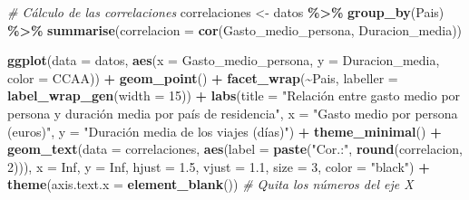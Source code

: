 \documentclass[data,article,submit,moreauthors,pdftex]{Definitions/mdpi}
\newenvironment{Shaded}{\begin{snugshade}}{\end{snugshade}}
\newcommand{\AttributeTok}[1]{\textcolor[rgb]{0.13,0.29,0.53}{#1}}
\newcommand{\CommentTok}[1]{\textcolor[rgb]{0.56,0.35,0.01}{\textit{#1}}}
\newcommand{\ConstantTok}[1]{\textcolor[rgb]{0.56,0.35,0.01}{#1}}
\newcommand{\DecValTok}[1]{\textcolor[rgb]{0.00,0.00,0.81}{#1}}
\newcommand{\FloatTok}[1]{\textcolor[rgb]{0.00,0.00,0.81}{#1}}
\newcommand{\FunctionTok}[1]{\textcolor[rgb]{0.13,0.29,0.53}{\textbf{#1}}}
\newcommand{\NormalTok}[1]{#1}
\newcommand{\OtherTok}[1]{\textcolor[rgb]{0.56,0.35,0.01}{#1}}
\newcommand{\SpecialCharTok}[1]{\textcolor[rgb]{0.81,0.36,0.00}{\textbf{#1}}}
\newcommand{\StringTok}[1]{\textcolor[rgb]{0.31,0.60,0.02}{#1}}
\begin{document}
\begin{Shaded}
\begin{Highlighting}[]
\CommentTok{\# Cálculo de las correlaciones}
\NormalTok{correlaciones }\OtherTok{\textless{}{-}}\NormalTok{ datos }\SpecialCharTok{\%\textgreater{}\%}
    \FunctionTok{group\_by}\NormalTok{(Pais) }\SpecialCharTok{\%\textgreater{}\%}
    \FunctionTok{summarise}\NormalTok{(}\AttributeTok{correlacion =} \FunctionTok{cor}\NormalTok{(Gasto\_medio\_persona, Duracion\_media))}


\FunctionTok{ggplot}\NormalTok{(}\AttributeTok{data =}\NormalTok{ datos, }\FunctionTok{aes}\NormalTok{(}\AttributeTok{x =}\NormalTok{ Gasto\_medio\_persona, }\AttributeTok{y =}\NormalTok{ Duracion\_media,}
    \AttributeTok{color =}\NormalTok{ CCAA)) }\SpecialCharTok{+} \FunctionTok{geom\_point}\NormalTok{() }\SpecialCharTok{+} \FunctionTok{facet\_wrap}\NormalTok{(}\SpecialCharTok{\textasciitilde{}}\NormalTok{Pais, }\AttributeTok{labeller =} \FunctionTok{label\_wrap\_gen}\NormalTok{(}\AttributeTok{width =} \DecValTok{15}\NormalTok{)) }\SpecialCharTok{+}
    \FunctionTok{labs}\NormalTok{(}\AttributeTok{title =} \StringTok{"Relación entre gasto medio por persona y duración media por país de residencia"}\NormalTok{,}
        \AttributeTok{x =} \StringTok{"Gasto medio por persona (euros)"}\NormalTok{, }\AttributeTok{y =} \StringTok{"Duración media de los viajes (días)"}\NormalTok{) }\SpecialCharTok{+}
    \FunctionTok{theme\_minimal}\NormalTok{() }\SpecialCharTok{+} \FunctionTok{geom\_text}\NormalTok{(}\AttributeTok{data =}\NormalTok{ correlaciones, }\FunctionTok{aes}\NormalTok{(}\AttributeTok{label =} \FunctionTok{paste}\NormalTok{(}\StringTok{"Cor.:"}\NormalTok{,}
    \FunctionTok{round}\NormalTok{(correlacion, }\DecValTok{2}\NormalTok{))), }\AttributeTok{x =} \ConstantTok{Inf}\NormalTok{, }\AttributeTok{y =} \ConstantTok{Inf}\NormalTok{, }\AttributeTok{hjust =} \FloatTok{1.5}\NormalTok{, }\AttributeTok{vjust =} \FloatTok{1.1}\NormalTok{,}
    \AttributeTok{size =} \DecValTok{3}\NormalTok{, }\AttributeTok{color =} \StringTok{"black"}\NormalTok{) }\SpecialCharTok{+} \FunctionTok{theme}\NormalTok{(}\AttributeTok{axis.text.x =} \FunctionTok{element\_blank}\NormalTok{())  }\CommentTok{\# Quita los números del eje X}
\end{Highlighting}
\end{Shaded}
\end{document}
